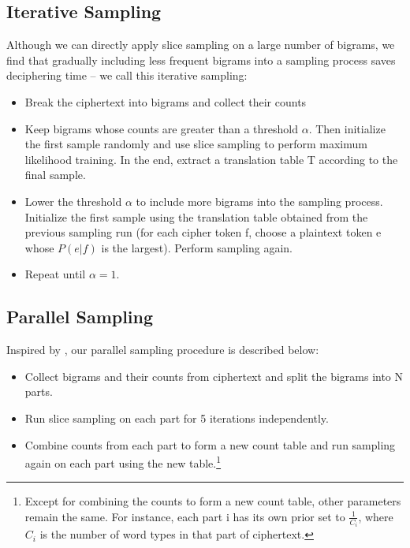 \subsection{Iterative Sampling}
Although we can directly apply slice sampling on a large number of bigrams, we find that gradually including less frequent bigrams into a sampling process saves deciphering time -- we call this iterative sampling:

 \begin{itemize}
  \item Break the ciphertext into bigrams and collect their counts
  \item Keep bigrams whose counts are greater than a threshold $\alpha$. Then initialize the first sample randomly and use slice sampling to perform maximum likelihood training. In the end, extract a translation table T according to the final sample.
  \item Lower the threshold $\alpha$ to include more bigrams into the sampling process. Initialize the first sample using the translation table obtained from the previous sampling run (for each cipher token f, choose a plaintext token e whose $P(e|f)$ is the largest). Perform sampling again.
  \item Repeat until $\alpha=1$.
\end{itemize}

\subsection{Parallel Sampling}
Inspired by \cite{newman:2009:distributed}, our parallel sampling procedure is described below:

\begin{itemize}
\item Collect bigrams and their counts from ciphertext and split the bigrams into N parts.
\item Run slice sampling on each part for 5 iterations independently.
\item Combine counts from each part to form a new count table and run sampling again on each part using the new table.\footnote{Except for combining the counts to form a new count table, other parameters remain the same. For instance, each part i has its own prior set to $\frac{1}{C_{i}}$, where $C_{i}$ is the number of word types in that part of ciphertext.}
\end{itemize}